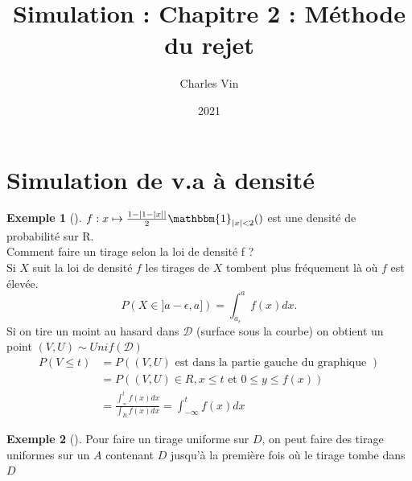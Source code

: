 \documentclass{article}
\title{Simulation : Chapitre 2 : Méthode du rejet}
\author{Charles Vin}
\date{2021}
\theoremstyle{plain}%
\theoremstyle{definition}
\newtheorem{exmp}{Exemple}[section]
\theoremstyle{remark}
\begin{document}
\maketitle

\section{Simulation de v.a à densité}
\begin{exmp}[]
	$ f: x \mapsto \frac{1- \left| 1- \left| x \right|  \right| }{2} \mathbbm{1}_{\left| x \right| < 2}() $ est une densité de probabilité sur R. \\
	Comment faire un tirage selon la loi de densité f ? \\
	Si $ X $ suit la loi de densité $ f $  les tirages de $ X $ tombent plus fréquement là où $ f $ est élevée. 
	\[
		P(X \in  ]a-\epsilon , a]) = \int_{a_\epsilon }^{a}f(x)dx
	.\]
	Si on tire un moint au hasard dans $ \mathcal{D} $ (surface sous la courbe) on obtient un point $ (V,U) \sim Unif(\mathcal{D}) $ 
	\begin{align*}
		P(V \leq t) &= P((V,U) \text{ est dans la partie gauche du graphique } ) \\ 
			&= P((V,U) \in R, x \leq t \text{ et } 0 \leq y \leq f(x)) \\
			&= \frac{\int_{_ \infty }^{t} f(x)dx}{\int_{R}^{} f(x) dx} = \int_{-\infty }^{t}f(x) dx
	\end{align*}
\end{exmp}
\begin{exmp}[]
	Pour faire un tirage uniforme sur $ D $, on peut faire des tirage uniformes sur un $ A $ contenant $ D $ jusqu'à la première fois où le tirage tombe dans $ D $   
\end{exmp}
\end{document}
